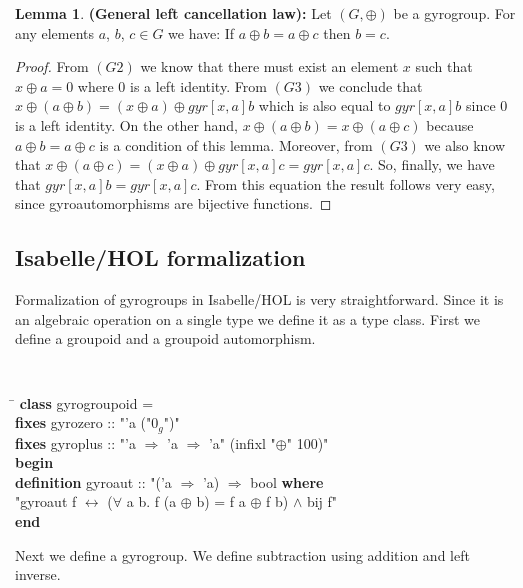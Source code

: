 \documentclass[a4paper]{article}
\theoremstyle{definition}
\newtheorem{lemma}[theorem]{Lemma}
\begin{document}
\begin{lemma}\label{lemma:left_cancel} \textbf{(General left cancellation law):} Let
  $(G,\oplus)$ be a gyrogroup. For any elements $a$, $b$, $c\in G$ we
  have: If $a\oplus b=a\oplus c$ then $b=c$.
\end{lemma}
\begin{proof} From $(G2)$ we know that there must exist an element $x$
  such that $x\oplus a = 0$ where $0$ is a left identity. From $(G3)$
  we conclude that
  $x\oplus (a\oplus b) = (x \oplus a) \oplus gyr[x,a]b$ which is also
  equal to $gyr[x,a]b$ since $0$ is a left identity. On the other
  hand, $x\oplus (a\oplus b)=x\oplus (a\oplus c)$ because
  $a\oplus b=a\oplus c$ is a condition of this lemma. Moreover, from
  $(G3)$ we also know that
  $x\oplus (a\oplus c) = (x \oplus a) \oplus gyr[x,a]c =
  gyr[x,a]c$. So, finally, we have that $gyr[x,a]b=gyr[x,a]c$. From
  this equation the result follows very easy, since gyroautomorphisms
  are bijective functions.
\end{proof}

\subsection{Isabelle/HOL formalization}

Formalization of gyrogroups in Isabelle/HOL is very
straightforward. Since it is an algebraic operation on a single type
we define it as a type class\cite{isabelle-classes}. First we define a
groupoid and a groupoid automorphism.

\begin{small}
{\tt
\begin{tabbing}
\hspace{5mm}\=\kill
{\bf class} gyrogroupoid =\\
\> {\bf fixes} gyrozero :: "'a ("$0_g$")"\\
\> {\bf fixes} gyroplus :: "'a  $\Rightarrow$  'a  $\Rightarrow$  'a" (infixl "$\oplus$" 100)"\\
{\bf begin}\\[1mm]
{\bf definition} gyroaut :: "('a $\Rightarrow$ 'a) $\Rightarrow$ bool {\bf where}\\
\>    "gyroaut f $\longleftrightarrow$ 
       ($\forall$ a b. f (a $\oplus$ b) = f a $\oplus$ f b) $\land$ 
       bij f"\\[1mm]
       {\bf end}
\end{tabbing}
}
\end{small}

Next we define a gyrogroup. We define subtraction using addition and
left inverse.
     
\end{document}

